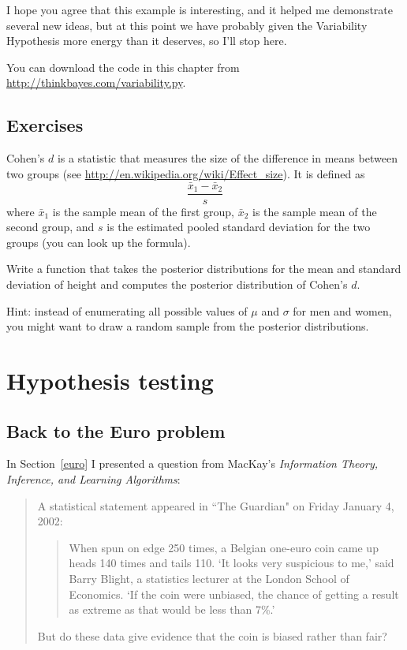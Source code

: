 \documentclass[12pt]{book}
\begin{document}
I hope you agree that this example is interesting, and it helped
me demonstrate several new ideas, but at this point we have probably
given the Variability Hypothesis more energy than it deserves, so
I'll stop here.

You can download the code in this chapter from
\url{http://thinkbayes.com/variability.py}.


\section{Exercises}

\begin{exercise}

Cohen's $d$ is a statistic that measures the size of the difference in
means between two groups (see
\url{http://en.wikipedia.org/wiki/Effect_size}).  It is defined as
%
\[ \frac{\bar{x}_1 - \bar{x}_2}{s} \]
%
where $\bar{x}_1$ is the sample mean of the first group, $\bar{x}_2$
is the sample mean of the second group, and $s$ is the estimated
pooled standard deviation for the two groups (you can look up the
formula).

Write a function that takes the posterior distributions for
the mean and standard deviation of height and computes the
posterior distribution of Cohen's $d$.

Hint: instead of enumerating all possible values of $\mu$ and
$\sigma$ for men and women, you might want to draw a random sample
from the posterior distributions.

\end{exercise}



\chapter{Hypothesis testing}

\section{Back to the Euro problem}

In Section~\ref{euro} I presented a question from MacKay's {\it Information
  Theory, Inference, and Learning Algorithms}:

\begin{quote}
A statistical statement appeared in ``The Guardian" on Friday January 4, 2002:

  \begin{quote}
        When spun on edge 250 times, a Belgian one-euro coin came
        up heads 140 times and tails 110.  `It looks very suspicious
        to me,' said Barry Blight, a statistics lecturer at the London
        School of Economics.  `If the coin were unbiased, the chance of
        getting a result as extreme as that would be less than 7\%.'
        \end{quote}

But do these data give evidence that the coin is biased rather than fair?
\end{quote}
\end{document}
